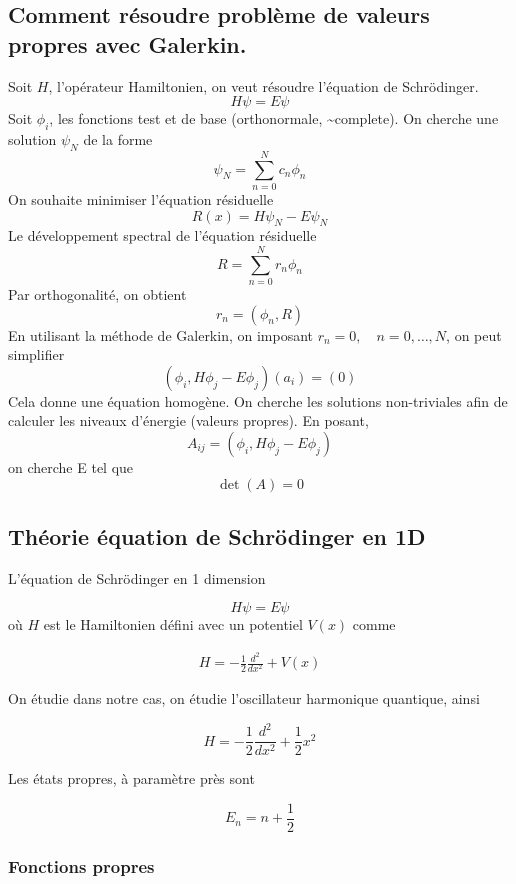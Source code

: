 \documentclass[
]{article}
\author{}
\date{}
\begin{document}
\hypertarget{comment-ruxe9soudre-probluxe8me-de-valeurs-propres-avec-galerkin.}{%
\subsection{Comment résoudre problème de valeurs propres avec
Galerkin.}\label{comment-ruxe9soudre-probluxe8me-de-valeurs-propres-avec-galerkin.}}

Soit \(H\), l'opérateur Hamiltonien, on veut résoudre l'équation de
Schrödinger. \[
H\psi = E\psi
\] Soit \(\phi_{i}\), les fonctions test et de base (orthonormale,
\textasciitilde complete). On cherche une solution \(\psi _N\) de la
forme \[
\psi_{N} = \sum_{n=0}^{N}c_{n}\phi_{n}
\] On souhaite minimiser l'équation résiduelle \[
R(x) = H\psi_{N}-E\psi_{N}
\] Le développement spectral de l'équation résiduelle \[
R =\sum_{n=0}^{N}r_{n}\phi_{n}
\] Par orthogonalité, on obtient \[
r_{n} =(\phi_{n},R)
\] En utilisant la méthode de Galerkin, on imposant
\(r_{n}= 0, \quad n= 0,\dots,N\), on peut simplifier \[
(\phi_{i},H\phi_{j}-E\phi_{j})(a_{i}) = (0)
\] Cela donne une équation homogène. On cherche les solutions
non-triviales afin de calculer les niveaux d'énergie (valeurs propres).
En posant, \[
A_{ij} =(\phi_{i},H\phi_{j}-E\phi_{j}) 
\] on cherche E tel que \[
\det(A) = 0
\]

\hypertarget{thuxe9orie-uxe9quation-de-schruxf6dinger-en-1d}{%
\subsection{Théorie équation de Schrödinger en
1D}\label{thuxe9orie-uxe9quation-de-schruxf6dinger-en-1d}}

L'équation de Schrödinger en 1 dimension

\[
H\psi=E\psi
\] où \(H\) est le Hamiltonien défini avec un potentiel \(V(x)\) comme

\[
\begin{aligned}
H = -\frac{1}{2} \frac{d^{2}}{dx^{2}} +V(x)
\end{aligned}
\]

On étudie dans notre cas, on étudie l'oscillateur harmonique quantique,
ainsi

\[
H = -\frac{1}{2} \frac{d^{2}}{dx^{2}} + \frac{1}{2}x^{2}
\]

Les états propres, à paramètre près sont

\[
E_{n}=n+\frac{1}{2}
\]

\hypertarget{fonctions-propres}{%
\subsubsection{Fonctions propres}\label{fonctions-propres}}
\end{document}
